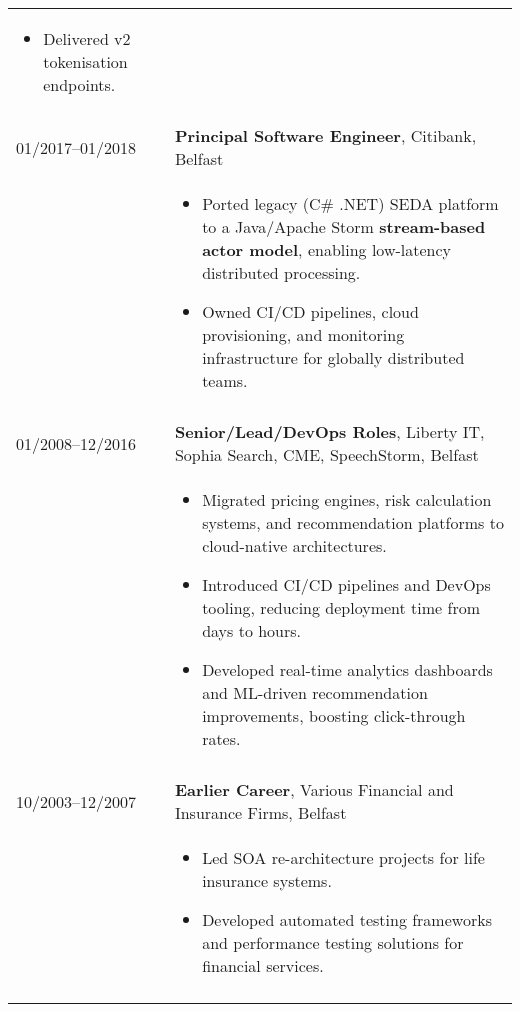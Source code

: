 \documentclass[2pt,a4paper]{article}
\newlength{\datecolumn}
\newlength{\textcolumn}
\begin{document}
\begin{longtable}{p{\datecolumn} p{\textcolumn}}
\begin{itemize}
                        \item Delivered v2 tokenisation endpoints.
                   \end{itemize} \\ \\
01/2017--01/2018 & \textbf{Principal Software Engineer}, Citibank, Belfast \\
                 & \begin{itemize}
                        \item Ported legacy (C\# .NET) SEDA platform to a Java/Apache Storm \textbf{stream-based actor model}, enabling low-latency distributed processing.
                        \item Owned CI/CD pipelines, cloud provisioning, and monitoring infrastructure for globally distributed teams.
                   \end{itemize} \\ \\
01/2008--12/2016 & \textbf{Senior/Lead/DevOps Roles}, Liberty IT, Sophia Search, CME, SpeechStorm, Belfast \\
                 & \begin{itemize}
                        \item Migrated pricing engines, risk calculation systems, and recommendation platforms to cloud-native architectures.
                        \item Introduced CI/CD pipelines and DevOps tooling, reducing deployment time from days to hours.
                        \item Developed real-time analytics dashboards and ML-driven recommendation improvements, boosting click-through rates.
                   \end{itemize} \\ \\
10/2003--12/2007 & \textbf{Earlier Career}, Various Financial and Insurance Firms, Belfast \\
                 & \begin{itemize}
                        \item Led SOA re-architecture projects for life insurance systems.
                        \item Developed automated testing frameworks and performance testing solutions for financial services.
                   \end{itemize} \\ \\
\end{longtable}
\end{document}
